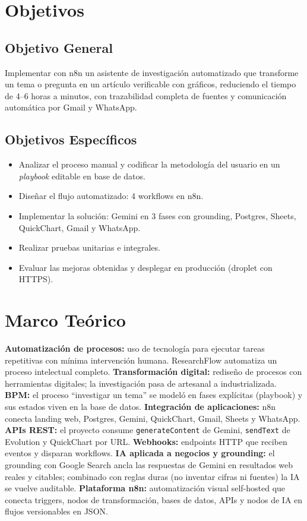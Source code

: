 \documentclass[11pt,a4paper]{article}
\newcommand{\code}[1]{\texttt{\small #1}}
\begin{document}
\section{Objetivos}
\subsection{Objetivo General}
Implementar con n8n un asistente de investigación automatizado que transforme un tema o pregunta en un artículo verificable con gráficos, reduciendo el tiempo de 4--6 horas a minutos, con trazabilidad completa de fuentes y comunicación automática por Gmail y WhatsApp.

\subsection{Objetivos Específicos}
\begin{itemize}[leftmargin=1.4em]
\item Analizar el proceso manual y codificar la metodología del usuario en un \emph{playbook} editable en base de datos.
\item Diseñar el flujo automatizado: 4 workflows en n8n.
\item Implementar la solución: Gemini en 3 fases con grounding, Postgres, Sheets, QuickChart, Gmail y WhatsApp.
\item Realizar pruebas unitarias e integrales.
\item Evaluar las mejoras obtenidas y desplegar en producción (droplet con HTTPS).
\end{itemize}

\section{Marco Teórico}
\textbf{Automatización de procesos:} uso de tecnología para ejecutar tareas repetitivas con mínima intervención humana. ResearchFlow automatiza un proceso intelectual completo. \textbf{Transformación digital:} rediseño de procesos con herramientas digitales; la investigación pasa de artesanal a industrializada. \textbf{BPM:} el proceso ``investigar un tema'' se modeló en fases explícitas (playbook) y sus estados viven en la base de datos. \textbf{Integración de aplicaciones:} n8n conecta landing web, Postgres, Gemini, QuickChart, Gmail, Sheets y WhatsApp. \textbf{APIs REST:} el proyecto consume \code{generateContent} de Gemini, \code{sendText} de Evolution y QuickChart por URL. \textbf{Webhooks:} endpoints HTTP que reciben eventos y disparan workflows. \textbf{IA aplicada a negocios y grounding:} el grounding con Google Search ancla las respuestas de Gemini en resultados web reales y citables; combinado con reglas duras (no inventar cifras ni fuentes) la IA se vuelve auditable. \textbf{Plataforma n8n:} automatización visual self-hosted que conecta triggers, nodos de transformación, bases de datos, APIs y nodos de IA en flujos versionables en JSON.
\end{document}
